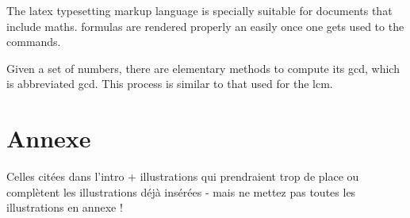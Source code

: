 \documentclass[11pt]{article}
\begin{document}
The \Gls{latex} typesetting markup language is specially suitable for documents that include \gls{maths}. \Glspl{formula} are rendered properly an easily once one gets used to the commands.

Given a set of numbers, there are elementary methods to compute its \acrlong{gcd}, which is abbreviated \acrshort{gcd}. This process is similar to that used for the \acrfull{lcm}.


\printglossary

\section {Annexe}  Celles citées dans l'intro +  illustrations qui prendraient trop de place ou complètent les illustrations déjà insérées  - mais ne mettez pas toutes les illustrations en annexe  ! 
\end{document}
